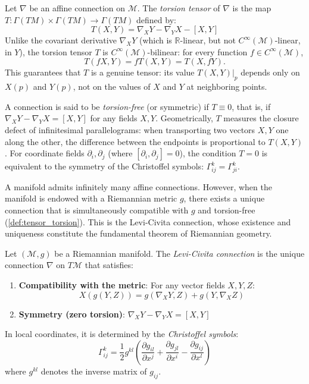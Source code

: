 \begin{definition}\label{def:tensor_torsion}
Let $\nabla$ be an affine connection on $\mathcal{M}$. The \textit{torsion tensor} of $\nabla$ is the map $T\colon \Gamma(TM) \times \Gamma(TM) \to \Gamma(TM)$ defined by:
\[
T(X,Y) = \nabla_X Y - \nabla_Y X - [X,Y]
\]
Unlike the covariant derivative $\nabla_X Y$ (which is $\mathbb{R}$-linear, but not $C^\infty(\mathcal{M})$-linear, in $Y$), the torsion tensor $T$ is $C^\infty(\mathcal{M})$-bilinear: for every function $f \in C^\infty(\mathcal{M})$,
\[
T(fX, Y) = fT(X,Y) = T(X, fY).
\]
This guarantees that $T$ is a genuine tensor: its value $T(X,Y)|_p$ depends only on $X(p)$ and $Y(p)$, not on the values of $X$ and $Y$ at neighboring points.

A connection is said to be \textit{torsion-free} (or symmetric) if $T \equiv 0$, that is, if $\nabla_X Y - \nabla_Y X = [X,Y]$ for any fields $X, Y$. Geometrically, $T$ measures the closure defect of infinitesimal parallelograms: when transporting two vectors $X, Y$ one along the other, the difference between the endpoints is proportional to $T(X,Y)$. For coordinate fields $\partial_i, \partial_j$ (where $[\partial_i, \partial_j] = 0$), the condition $T = 0$ is equivalent to the symmetry of the Christoffel symbols: $\Gamma^k_{ij} = \Gamma^k_{ji}$.
\end{definition}

A manifold admits infinitely many affine connections. However, when the manifold is endowed with a Riemannian metric $g$, there exists a unique connection that is simultaneously compatible with $g$ and torsion-free (\autoref{def:tensor_torsion}). This is the Levi-Civita connection, whose existence and uniqueness constitute the fundamental theorem of Riemannian geometry.

\begin{definition}\label{def:conexion_levi_civita_gdl}
Let $(\mathcal{M}, g)$ be a Riemannian manifold. The \textit{Levi-Civita connection} is the unique connection $\nabla$ on $T\mathcal{M}$ that satisfies:
\begin{enumerate}
	\item \textbf{Compatibility with the metric}: For any vector fields $X, Y, Z$:
	\[
	X(g(Y,Z)) = g(\nabla_X Y, Z) + g(Y, \nabla_X Z)
	\]
	\item \textbf{Symmetry (zero torsion)}: $\nabla_X Y - \nabla_Y X = [X, Y]$
\end{enumerate}
In local coordinates, it is determined by the \textit{Christoffel symbols}:
\[
\Gamma^k_{ij} = \frac{1}{2} g^{kl}\left(\frac{\partial g_{il}}{\partial x^j} + \frac{\partial g_{jl}}{\partial x^i} - \frac{\partial g_{ij}}{\partial x^l}\right)
\]
where $g^{kl}$ denotes the inverse matrix of $g_{ij}$.
\end{definition}

